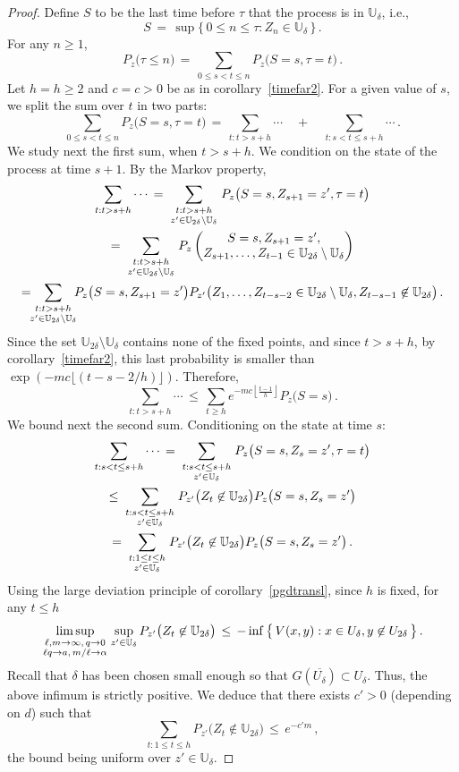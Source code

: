 \documentclass[a4paper,12pt]{article}
\theoremstyle{definition}
\theoremstyle{remark}
\def \a {\alpha}
\def \d {\delta}
\def \dU {\mathbb{U}}
\def\lmq {{\genfrac{}{}{0pt}{1}{\ell,m\to\infty,\,q\to0}{\ell q\to a,\,m/\ell\to\a}}}
\begin{document}
\begin{proof}
Define $S$ to be the last time before $\tau$ that the process is in $\dU_\d$, i.e.,
$$S\,=\,\sup\big\lbrace\,
0\leq n\leq \tau:Z_n\in\dU_\d
\,\big\rbrace\,.$$
For any $n\geq 1$,
$$P_z\big(
\tau\leq n
\big)\,=\,\sum_{0\leq s<t\leq n}P_z\big(
S=s,\tau=t
\big)\,.$$
Let $h=h\geq 2$ and $c=c>0$ be as in corollary~\ref{timefar2}.
For a given value of $s$, we split the sum over $t$ in two parts:
$$
\sum_{0\leq s<t\leq n}P_z\big(
S=s,\tau=t
\big)\,=\,\sum_{t:t>s+h}\cdots\quad +\quad\sum_{t:s<t\leq s+h}\cdots\,.
$$
We study next the first sum, when $t>s+h$.
We condition on the state of the process at time $s+1$.
By the Markov property,
\begin{multline*}
\sum_{t:t>s+h}\cdots\,=\,\sum_{\genfrac{}{}{0pt}{1}{t:t>s+h}{z'\in\dU_{2\d}\setminus\dU_\d}}P_z\big(
S=s,Z_{s+1}=z',\tau=t
\big)\\
=\,\sum_{\genfrac{}{}{0pt}{1}{t:t>s+h}{z'\in\dU_{2\d}\setminus\dU_\d}}
P_z\left(
\begin{matrix}
S=s,Z_{s+1}=z',\\
Z_{s+1},\dots,Z_{t-1}\in\dU_{2\d}\setminus\dU_\d
\end{matrix}
\right)\\
=\!\!\!\sum_{\genfrac{}{}{0pt}{1}{t:t>s+h}{z'\in\dU_{2\d}\setminus\dU_\d}}\!\!\!P_z\big(
S=s,Z_{s+1}=z'
\big)
P_{z'}\big(
Z_1,\dots,Z_{t-s-2}\in\dU_{2\d}\setminus\dU_\d,
Z_{t-s-1}\not\in\dU_{2\d}
\big)\,.
\end{multline*}
Since the set $\dU_{2\d}\setminus\dU_\d$ contains none of the fixed points,
and since $t>s+h$,
by corollary~\ref{timefar2},
this last probability is smaller than $\exp(-mc\lfloor(t-s-2/h)\rfloor)$.
Therefore,
$$\sum_{t:t>s+h}\cdots\,\leq\,\sum_{t\geq h}
e^{-mc\left\lfloor\frac{t-1}{h}\right\rfloor}P_z\big(
S=s
\big)\,.$$
We bound next the second sum.
Conditioning on the state at time $s$:
\begin{multline*}
\sum_{t:s<t\leq s+h}\cdots\,=\,
\sum_{\genfrac{}{}{0pt}{1}{t:s<t\leq s+h}{z'\in\dU_\d}}P_z\big(
S=s,Z_s=z', \tau=t
\big)\\
\leq\,\sum_{\genfrac{}{}{0pt}{1}{t:s<t\leq s+h}{z'\in\dU_\d}}
P_{z'}\big(
Z_t\not\in\dU_{2\d}
\big)
P_z\big(
S=s,Z_s=z'
\big)\\
=\,\sum_{\genfrac{}{}{0pt}{1}{t:1\leq t\leq h}{z'\in\dU_\d}}
P_{z'}\big(
Z_t\not\in\dU_{2\d}
\big)
P_z\big(
S=s,Z_s=z'
\big)\,.
\end{multline*}
Using the large deviation principle of corollary~\ref{pgdtransl}, since $h$ is fixed, for any $t\leq h$
$$\limsup_\lmq\sup_{z'\in\dU_\d}P_{z'}\big(
Z_t\not\in\dU_{2\d}
\big)\,\leq\,-\inf\big\lbrace\,
V(x,y):x\in U_\d, y\not\in U_{2\d}
\,\big\rbrace\,.$$
Recall that $\d$ has been chosen small enough so that 
$G(\overline{U_\d})\subset U_\d$. Thus,
the above infimum is strictly positive.
We deduce that there exists $c'>0$ (depending on $d$) such that 
$$\sum_{t:1\leq t\leq h}
P_{z'}\big(
Z_t\not\in\dU_{2\d}
\big)\,\leq\,e^{-c' m}\,,$$
the bound being uniform over $z'\in\dU_\d$. 
\end{proof} 
\end{document}

